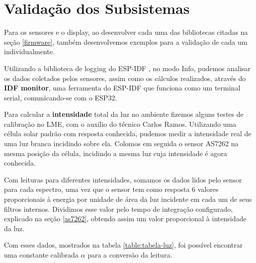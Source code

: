 \documentclass[../monografia.tex]{subfiles}
\begin{document}


\section{Validação dos Subsistemas} %

Para os sensores e o display, ao desenvolver cada uma das bibliotecas citadas na seção \ref{firmware}, também desenvolvemos exemplos para a validação de cada um individualmente. 

Utilizando a biblioteca de logging do ESP-IDF \cite{log-esp}, no modo Info, pudemos analisar os dados coletados pelos sensores, assim como os cálculos realizados, através do \textbf{IDF monitor}, uma ferramenta do ESP-IDF que funciona como um terminal serial, comunicando-se com o ESP32. 

Para calcular a \textbf{intensidade} total da luz no ambiente fizemos alguns testes de calibração no LME, com o auxílio do técnico Carlos Ramos. Utilizando uma célula solar padrão com resposta conhecida, pudemos medir a intensidade real de uma luz branca incidindo sobre ela. Colomos em seguida o sensor AS7262 na mesma posição da célula, incidindo a mesma luz cuja intensidade é agora conhecida. 

Com leituras para diferentes intensidades, somamos os dados lidos pelo sensor para cada espectro, uma vez que o sensor tem como resposta 6 valores proporcionais à energia por unidade de área da luz incidente em cada um de seus filtros internos. 
Dividimos esse valor pelo tempo de integração configurado, explicado na seção \ref{as7262}, obtendo assim um valor proporcional à intensidade da luz. 	

Com esses dados, mostrados na tabela \ref{table:tabela-luz}, foi possível encontrar uma constante calibrada $\alpha$  para a conversão da leitura. \newpage
\end{document}
